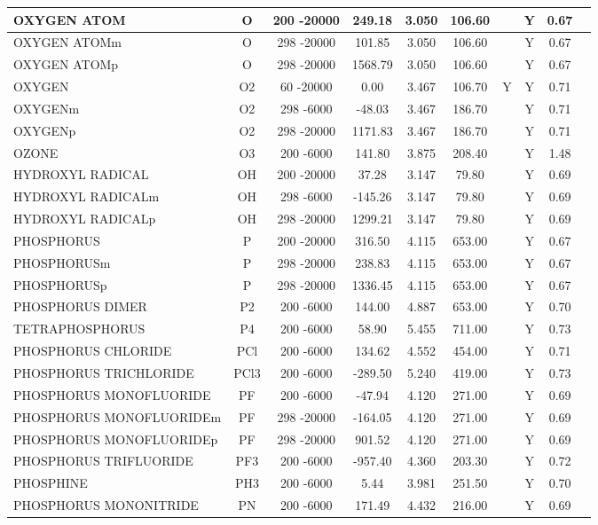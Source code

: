 \begin{longtable}{@{\extracolsep{\fill}}|l|c|c|c|c|c|c|c|c|l|}
OXYGEN ATOM&O&200 -20000&  249.18& 3.050&   106.60& &Y& 0.67&\\ \hline
OXYGEN ATOMm&O&298 -20000&  101.85& 3.050&   106.60& &Y& 0.67&\\ \hline
OXYGEN ATOMp&O&298 -20000& 1568.79& 3.050&   106.60& &Y& 0.67&\\ \hline
OXYGEN&O2&60 -20000&    0.00& 3.467&   106.70&Y&Y& 0.71&\\ \hline
OXYGENm&O2&298 -6000&  -48.03& 3.467&   186.70& &Y& 0.71&\\ \hline
OXYGENp&O2&298 -20000& 1171.83& 3.467&   186.70& &Y& 0.71&\\ \hline
OZONE&O3&200 -6000&  141.80& 3.875&   208.40& &Y& 1.48&\\ \hline
HYDROXYL RADICAL&OH&200 -20000&   37.28& 3.147&    79.80& &Y& 0.69&\\ \hline
HYDROXYL RADICALm&OH&298 -6000& -145.26& 3.147&    79.80& &Y& 0.69&\\ \hline
HYDROXYL RADICALp&OH&298 -20000& 1299.21& 3.147&    79.80& &Y& 0.69&\\ \hline
PHOSPHORUS&P&200 -20000&  316.50& 4.115&   653.00& &Y& 0.67&\\ \hline
PHOSPHORUSm&P&298 -20000&  238.83& 4.115&   653.00& &Y& 0.67&\\ \hline
PHOSPHORUSp&P&298 -20000& 1336.45& 4.115&   653.00& &Y& 0.67&\\ \hline
PHOSPHORUS DIMER&P2&200 -6000&  144.00& 4.887&   653.00& &Y& 0.70&\\ \hline
TETRAPHOSPHORUS&P4&200 -6000&   58.90& 5.455&   711.00& &Y& 0.73&\\ \hline
PHOSPHORUS CHLORIDE&PCl&200 -6000&  134.62& 4.552&   454.00& &Y& 0.71&\\ \hline
PHOSPHORUS TRICHLORIDE&PCl3&200 -6000& -289.50& 5.240&   419.00& &Y& 0.73&\\ \hline
PHOSPHORUS MONOFLUORIDE&PF&200 -6000&  -47.94& 4.120&   271.00& &Y& 0.69&\\ \hline
PHOSPHORUS MONOFLUORIDEm&PF&298 -20000& -164.05& 4.120&   271.00& &Y& 0.69&\\ \hline
PHOSPHORUS MONOFLUORIDEp&PF&298 -20000&  901.52& 4.120&   271.00& &Y& 0.69&\\ \hline
PHOSPHORUS TRIFLUORIDE&PF3&200 -6000& -957.40& 4.360&   203.30& &Y& 0.72&\\ \hline
PHOSPHINE&PH3&200 -6000&    5.44& 3.981&   251.50& &Y& 0.70&\\ \hline
PHOSPHORUS MONONITRIDE&PN&200 -6000&  171.49& 4.432&   216.00& &Y& 0.69&\\ \hline

\end{longtable}

